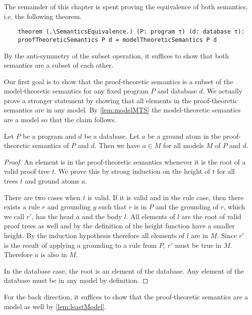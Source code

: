 The remainder of this chapter is spent proving the equivalence of both semantics, i.e. the following theorem.

\begin{lstlisting}
    theorem (.\SemanticsEquivalence.) (P: program τ) (d: database τ): 
    proofTheoreticSemantics P d = modelTheoreticSemantics P d
\end{lstlisting}

By the anti-symmetry of the subset operation, it suffices to show that both semantics are a subset of each other.

Our first goal is to show that the proof-theoretic semantics is a subset of the model-theoretic semantics for any fixed program $P$ and database $d$. We actually prove a stronger statement by showing that all elements in the proof-theoretic semantics are in any model. By \cref{lem:modelMTS} the model-theoretic semantics are a model so that the claim follows.

\begin{lemma}[\proofTreeAtomsInEveryModel]
    Let $P$ be a program and $d$ be a database. Let $a$ be a ground atom in the proof-theoretic semantics of $P$ and $d$. Then we have $a \in M$ for all models $M$ of $P$ and $d$.
\end{lemma}
\begin{proof}
    An element is in the proof-theoretic semantics whenever it is the root of a valid proof tree $t$. We prove this by strong induction on the height of $t$ for all trees $t$ and ground atoms $a$.

    There are two cases when $t$ is valid. If it is valid and in the rule case, then there exists a rule $r$ and grounding $g$ such that $r$ is in $P$ and the grounding of $r$, which we call $r'$, has the head $a$ and the body $l$. All elements of $l$ are the root of valid proof trees as well and by the definition of the height function have a smaller height. By the induction hypothesis therefore all elements of $l$ are in $M$. Since $r'$ is the result of applying a grounding to a rule from $P$, $r'$ must be true in $M$. Therefore $a$ is also in $M$.

    In the database case, the root is an element of the database. Any element of the database must be in any model by definition. 
\end{proof}

For the back direction, it suffices to show that the proof-theoretic semantics are a model as well by \cref{lem:leastModel}.

